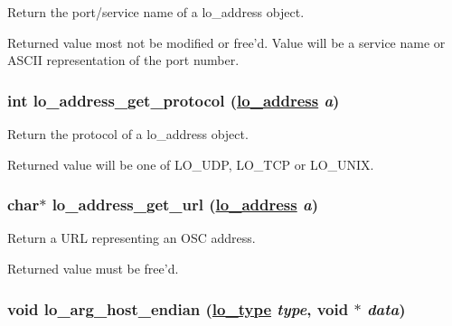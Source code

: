 Return the port/service name of a lo\_\-address object. 

Returned value most not be modified or free'd. Value will be a service name or ASCII representation of the port number. \hypertarget{group__liblolowlevel_gaae09ebb4cf42e92504fe9aa7e7b2184}{
\subsubsection[lo\_\-address\_\-get\_\-protocol]{\setlength{\rightskip}{0pt plus 5cm}int lo\_\-address\_\-get\_\-protocol (\hyperlink{lo__types_8h_bf9b53223467de596b89e1377b0f3f3d}{lo\_\-address} {\em a})}}
\label{group__liblolowlevel_gaae09ebb4cf42e92504fe9aa7e7b2184}


Return the protocol of a lo\_\-address object. 

Returned value will be one of LO\_\-UDP, LO\_\-TCP or LO\_\-UNIX. \hypertarget{group__liblolowlevel_g85d7101e9e3a3339544445b539e3a5d2}{
\subsubsection[lo\_\-address\_\-get\_\-url]{\setlength{\rightskip}{0pt plus 5cm}char$\ast$ lo\_\-address\_\-get\_\-url (\hyperlink{lo__types_8h_bf9b53223467de596b89e1377b0f3f3d}{lo\_\-address} {\em a})}}
\label{group__liblolowlevel_g85d7101e9e3a3339544445b539e3a5d2}


Return a URL representing an OSC address. 

Returned value must be free'd. \hypertarget{group__liblolowlevel_g29fc246595334f29d97d11b0186b17bd}{
\subsubsection[lo\_\-arg\_\-host\_\-endian]{\setlength{\rightskip}{0pt plus 5cm}void lo\_\-arg\_\-host\_\-endian (\hyperlink{group__liblo_g11838c576b0197c255ce805fd7434736}{lo\_\-type} {\em type}, void $\ast$ {\em data})}}
\label{group__liblolowlevel_g29fc246595334f29d97d11b0186b17bd}


